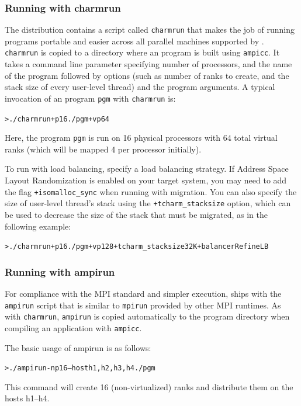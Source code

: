 \documentclass[10pt]{article}
\begin{document}
\subsubsection{Running with charmrun}
The \charmpp{} distribution contains a script called \texttt{charmrun} that
makes the job of running \ampi{} programs portable and easier across all
parallel machines supported by \charmpp{}. \texttt{charmrun} is copied to a
directory where an \ampi{} program is built using \texttt{ampicc}. It takes a command
line parameter specifying number of processors, and the name of the program
followed by \ampi{} options (such as number of ranks to create, and the stack size
of every user-level thread) and the program arguments. A typical invocation of an \ampi{}
program \texttt{pgm} with \texttt{charmrun} is:

\begin{alltt}
> ./charmrun +p16 ./pgm +vp64
\end{alltt}

Here, the \ampi{} program \texttt{pgm} is run on 16 physical processors with
64 total virtual ranks (which will be mapped 4 per processor initially).

To run with load balancing, specify a load balancing strategy. If Address Space
Layout Randomization is enabled on your target system, you may need to add the
flag \texttt{+isomalloc\_sync} when running with migration. You can also specify
the size of user-level thread's stack using the \texttt{+tcharm\_stacksize}
option, which can be used to decrease the size of the stack that must be
migrated, as in the following example:

\begin{alltt}
> ./charmrun +p16 ./pgm +vp128 +tcharm_stacksize 32K +balancer RefineLB
\end{alltt}


\subsubsection{Running with ampirun}

For compliance with the MPI standard and simpler execution, \ampi{} ships with the 
\texttt{ampirun} script that is similar to \texttt{mpirun} provided by other MPI 
runtimes. As with \texttt{charmrun}, \texttt{ampirun} is copied automatically to 
the program directory when compiling an application with \texttt{ampicc}.

The basic usage of ampirun is as follows:
\begin{alltt}
> ./ampirun -np 16 --host h1,h2,h3,h4 ./pgm
\end{alltt}
This command will create 16 (non-virtualized) ranks and distribute them on the hosts h1--h4.
\end{document}
